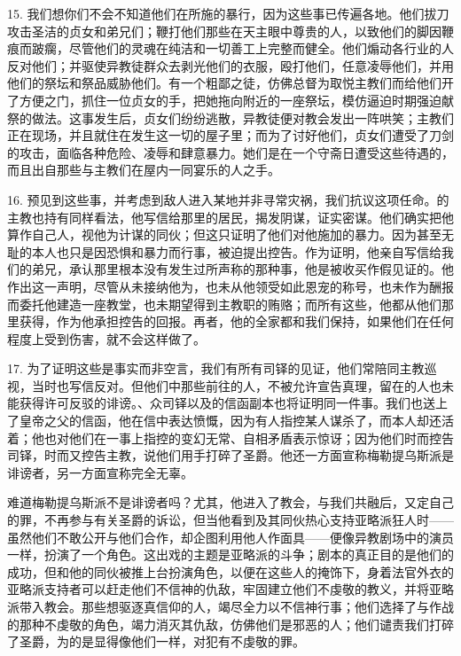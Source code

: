 15. 我们想你们不会不知道他们在所施的暴行，因为这些事已传遍各地。他们拔刀攻击圣洁的贞女和弟兄们；鞭打他们那些在天主眼中尊贵的人，以致他们的脚因鞭痕而跛瘸，尽管他们的灵魂在纯洁和一切善工上完整而健全。他们煽动各行业的人反对他们；并驱使异教徒群众去剥光他们的衣服，殴打他们，任意凌辱他们，并用他们的祭坛和祭品威胁他们。有一个粗鄙之徒，仿佛总督为取悦主教们而给他们开了方便之门，抓住一位贞女的手，把她拖向附近的一座祭坛，模仿逼迫时期强迫献祭的做法。这事发生后，贞女们纷纷逃散，异教徒便对教会发出一阵哄笑；主教们正在现场，并且就住在发生这一切的屋子里；而为了讨好他们，贞女们遭受了刀剑的攻击，面临各种危险、凌辱和肆意暴力。她们是在一个守斋日遭受这些待遇的，而且出自那些与主教们在屋内一同宴乐的人之手。\par

16. 预见到这些事，并考虑到敌人进入某地并非寻常灾祸，我们抗议这项任命。的主教也持有同样看法，他写信给那里的居民，揭发阴谋，证实密谋。他们确实把他算作自己人，视他为计谋的同伙；但这只证明了他们对他施加的暴力。因为甚至无耻的本人也只是因恐惧和暴力而行事，被迫提出控告。作为证明，他亲自写信给我们的弟兄，承认那里根本没有发生过所声称的那种事，他是被收买作假见证的。他作出这一声明，尽管从未接纳他为，也未从他领受如此恩宠的称号，也未作为酬报而委托他建造一座教堂，也未期望得到主教职的贿赂；而所有这些，他都从他们那里获得，作为他承担控告的回报。再者，他的全家都和我们保持，如果他们在任何程度上受到伤害，就不会这样做了。\par

17. 为了证明这些是事实而非空言，我们有所有司铎的见证，他们常陪同主教巡视，当时也写信反对。但他们中那些前往的人，不被允许宣告真理，留在的人也未能获得许可反驳的诽谤。、众司铎以及的信函副本也将证明同一件事。我们也送上了皇帝之父的信函，他在信中表达愤慨，因为有人指控某人谋杀了，而本人却还活着；他也对他们在一事上指控的变幻无常、自相矛盾表示惊讶；因为他们时而控告司铎，时而又控告主教，说他们用手打碎了圣爵。他还一方面宣称梅勒提乌斯派是诽谤者，另一方面宣称完全无辜。\par

难道梅勒提乌斯派不是诽谤者吗？尤其，他进入了教会，与我们共融后，又定自己的罪，不再参与有关圣爵的诉讼，但当他看到及其同伙热心支持亚略派狂人时——虽然他们不敢公开与他们合作，却企图利用他人作面具——便像异教剧场中的演员一样，扮演了一个角色。这出戏的主题是亚略派的斗争；剧本的真正目的是他们的成功，但和他的同伙被推上台扮演角色，以便在这些人的掩饰下，身着法官外衣的亚略派支持者可以赶走他们不信神的仇敌，牢固建立他们不虔敬的教义，并将亚略派带入教会。那些想驱逐真信仰的人，竭尽全力以不信神行事；他们选择了与作战的那种不虔敬的角色，竭力消灭其仇敌，仿佛他们是邪恶的人；他们谴责我们打碎了圣爵，为的是显得像他们一样，对犯有不虔敬的罪。\par


